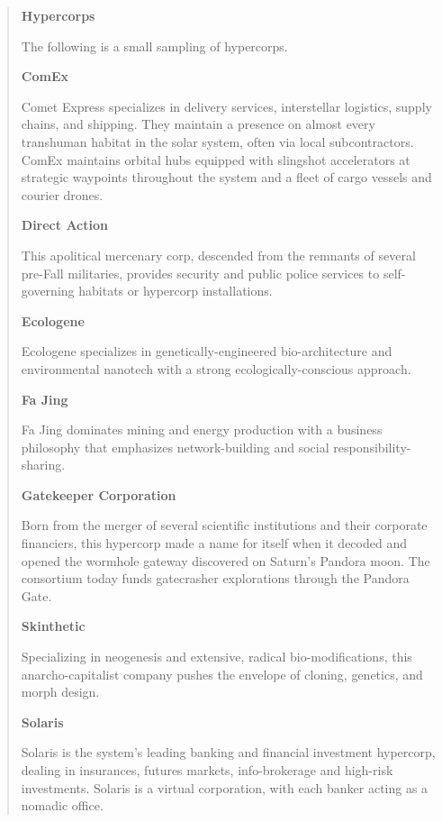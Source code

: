 \begin{quote}
   \textbf{Hypercorps}

   The following is a small sampling of hypercorps.

   \textbf{ComEx}

   Comet Express specializes in delivery services, interstellar logistics,
   supply chains, and shipping. They maintain a presence on almost every
   transhuman habitat in the solar system, often via local subcontractors.
   ComEx maintains orbital hubs equipped with slingshot accelerators at
   strategic waypoints throughout the system and a fleet of cargo vessels
   and courier drones.


   \textbf{Direct Action}

   This apolitical mercenary corp, descended from the remnants of several
   pre-Fall militaries, provides security and public police services to
   self-governing habitats or hypercorp installations.


   \textbf{Ecologene}

   Ecologene specializes in genetically-engineered bio-architecture and
   environmental nanotech with a strong ecologically-conscious approach.


   \textbf{Fa Jing}

   Fa Jing dominates mining and energy production with a business philosophy
   that emphasizes network-building and social responsibility-sharing.


   \textbf{Gatekeeper Corporation}

   Born from the merger of several scientific institutions and their corporate
   financiers, this hypercorp made a name for itself when it decoded and opened
   the wormhole gateway discovered on Saturn's Pandora moon. The consortium
   today funds gatecrasher explorations through the Pandora Gate.


   \textbf{Skinthetic}

   Specializing in neogenesis and extensive, radical bio-modifications, this
   anarcho-capitalist company pushes the envelope of cloning, genetics, and
   morph design.


   \textbf{Solaris} 

   Solaris is the system's leading banking and financial investment hypercorp,
   dealing in insurances, futures markets, info-brokerage and high-risk
   investments. Solaris is a virtual corporation, with each banker acting as
   a nomadic office.
\end{quote}

